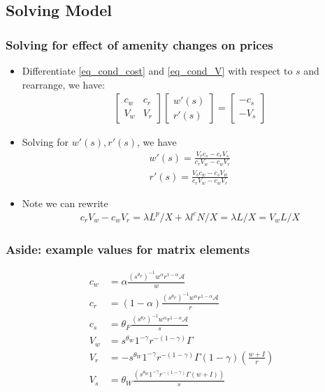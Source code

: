 \documentclass[11pt,notes=hide,aspectratio=169]{beamer}
\begin{document}
\subsection{Solving Model}
\begin{frame}
\frametitle{Solving for effect of amenity changes on prices}
\begin{itemize}
\item Differentiate \eqref{eq_cond_cost} and \eqref{eq_cond_V} with respect to $s$ and rearrange, we have:
\begin{align*}
\begin{bmatrix}
c_w & c_r \\
V_w & V_r
\end{bmatrix}
\begin{bmatrix}
w'(s) \\
r'(s)
\end{bmatrix} = 
\begin{bmatrix}
-c_s\\
-V_s
\end{bmatrix}
\end{align*}
\item Solving for $w'(s), r'(s)$, we have
\begin{align*}
w'(s) = \frac{V_r c_s - c_r V_s}{c_r V_w - c_w V_r} \\
r'(s) = \frac{V_s c_w - c_s V_w}{c_r V_w - c_w V_r} 
\end{align*}
\item Note we can rewrite
\begin{align*}
c_r V_w - c_w V_r = \lambda L^p/X + \lambda l^c N/X = \lambda L/X =V_w L/X
\end{align*}
\end{itemize}
\end{frame}
\begin{frame}
\frametitle{Aside: example values for matrix elements}
\begin{align*}
c_w &= \alpha \frac{(s^{\theta_F})^{-1}w^\alpha r^{1-\alpha} \mathcal{A}}{w} \\
c_r &= (1-\alpha) \frac{(s^{\theta_F})^{-1}w^\alpha r^{1-\alpha} \mathcal{A}}{r} \\
c_s &= \theta_F \frac{ (s^{\theta_F})^{-1}w^\alpha r^{1-\alpha} \mathcal{A}}{s} \\
V_w &=s^{\theta_W} 1^{-\gamma} r^{-(1-\gamma)}  \Gamma \\
V_r &= -s^{\theta_W} 1^{-\gamma} r^{-(1-\gamma)}\Gamma (1-\gamma)\left(\frac{w + I}{r}\right)   \\
V_s &= \theta_W \frac{\left(  s^{\theta_W} 1^{-\gamma} r^{-(1-\gamma)}\Gamma  \left(w + I\right) \right)}{s}
\end{align*}
\end{frame}
\end{document}
